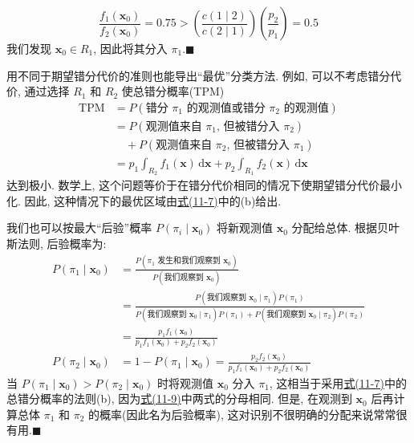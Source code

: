
\[
\frac{f_1(\mathbf{x}_0)}{f_2(\mathbf{x}_0)}=0.75>\left(\frac{c(1\mid2)}{c(2\mid1)}\right)\left(\frac{p_2}{p_1}\right)=0.5
\]
我们发现 $\mathbf{x}_0\in R_1$, 因此将其分入 $\pi_1$.\hfill$\blacksquare$

用不同于期望错分代价的准则也能导出“最优”分类方法. 例如, 可以不考虑错分代价, 通过选择 $R_1$ 和 $R_2$ 使总错分概率(TPM)
\label{eq:11-8}
\begin{equation}
\begin{aligned}
\mathrm{TPM}&=P(\text{错分 }\pi_1\text{ 的观测值或错分 }\pi_2\text{ 的观测值})\\
&=P(\text{观测值来自 }\pi_1\text{, 但被错分入 }\pi_2)\\
&\quad +P(\text{观测值来自 }\pi_2\text{, 但被错分入 }\pi_1)\\
&=p_1\int_{R_2}f_1(\mathbf{x})\,\mathrm{d}\mathbf{x}+p_2\int_{R_1}f_2(\mathbf{x})\,\mathrm{d}\mathbf{x}
\end{aligned}
\tag{11-8}
\end{equation}
达到极小. 数学上, 这个问题等价于在错分代价相同的情况下使期望错分代价最小化. 因此, 这种情况下的最优区域由\hyperref[eq:11-7]{式(11-7)}中的(b)给出.

我们也可以按最大“后验”概率 $P(\pi_i\mid\mathbf{x}_0)$ 将新观测值 $\mathbf{x}_0$ 分配给总体. 根据贝叶斯法则, 后验概率为:
\label{eq:11-9}
\begin{equation}
\begin{aligned}
P(\pi_1\mid\mathbf{x}_0)&=\frac{P(\pi_1\text{ 发生和我们观察到 }\mathbf{x}_0)}{P(\text{我们观察到 }\mathbf{x}_0)}\\
&=\frac{P(\text{我们观察到 }\mathbf{x}_0\mid\pi_1)P(\pi_1)}{P(\text{我们观察到 }\mathbf{x}_0\mid\pi_1)P(\pi_1)+P(\text{我们观察到 }\mathbf{x}_0\mid\pi_2)P(\pi_2)}\\
&=\frac{p_1f_1(\mathbf{x}_0)}{p_1f_1(\mathbf{x}_0)+p_2f_2(\mathbf{x}_0)}\\
P(\pi_2\mid\mathbf{x}_0)&=1-P(\pi_1\mid\mathbf{x}_0)=\frac{p_2f_2(\mathbf{x}_0)}{p_1f_1(\mathbf{x}_0)+p_2f_2(\mathbf{x}_0)}
\end{aligned}
\tag{11-9}
\end{equation}
当 $P(\pi_1\mid\mathbf{x}_0)>P(\pi_2\mid\mathbf{x}_0)$ 时将观测值 $\mathbf{x}_0$ 分入 $\pi_1$, 这相当于采用\hyperref[eq:11-7]{式(11-7)}中的总错分概率的法则(b), 因为\hyperref[eq:11-9]{式(11-9)}中两式的分母相同. 但是, 在观测到 $\mathbf{x}_0$ 后再计算总体 $\pi_1$ 和 $\pi_2$ 的概率(因此名为后验概率), 这对识别不很明确的分配来说常常很有用.\hfill$\blacksquare$

